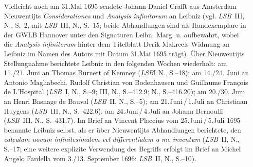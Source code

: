 Vielleicht noch am 31.\;Mai 1695 sendete Johann Daniel Crafft aus Amsterdam Nieuwentijts \textit{Considerationes}\cite{01494} und \textit{Analysis infinitorum}\cite{01495} an Leibniz (vgl. \textit{LSB}~III, N., S.--2,\cite{01496} mit \textit{LSB}~III, N., S.--15;\cite{01497} beide Abhandlungen sind als Handexemplare in der GWLB Hannover unter den Signaturen Leibn. Marg. u. aufbewahrt, wobei die \textit{Analysis infinitorum}\cite{01495} hinter dem Titelblatt Derik Makreels Widmung an Leibniz im Namen des Autors mit Datum 31.\;Mai 1695 trägt).
Über Nieuwentijts Stellungnahme berichtete Leibniz in den folgenden Wochen wiederholt:
am 11./21. Juni an Thomas Burnett of Kemney (\textit{LSB}I N., S.--18);\cite{01498}
am 14./24. Juni an Antonio Magliabechi, Rudolf Christian von Bodenhausen und Guillaume François de L'Hospital (\textit{LSB}~I, N., S.--9;\cite{01499} III, N., S.--412.9;\cite{02500} N., S.--416.20);\cite{02501}
am 20./30. Juni an Henri Basnage de Bauval (\textit{LSB}~II, N., S.--5);\cite{02502}
am 21.\;Juni\,/\,1.\;Juli an Christiaan Huygens (\textit{LSB}~III, N., S.--422.6);\cite{02503}
am 24.\;Juni\,/\,4.\;Juli an Johann Bernoulli (\textit{LSB}~III, N., S.--431.7).\cite{02504}
Im Brief an Vincent Placcius vom 25.\;Juni\,/\,5.\;Juli 1695 benannte Leibniz selbst, als er über Nieuwentijts Abhandlungen berichtete, den \textit{calculum novum infinitesimalem vel differentialem a me inventum} (\textit{LSB}~II, N., S.--17;\cite{01492} eine weitere explizite Verwendung des Begriffs erfolgt im Brief an Michel Angelo Fardella vom 3./13. September 1696: \textit{LSB}~II, N., S.--10).\cite{01493}
